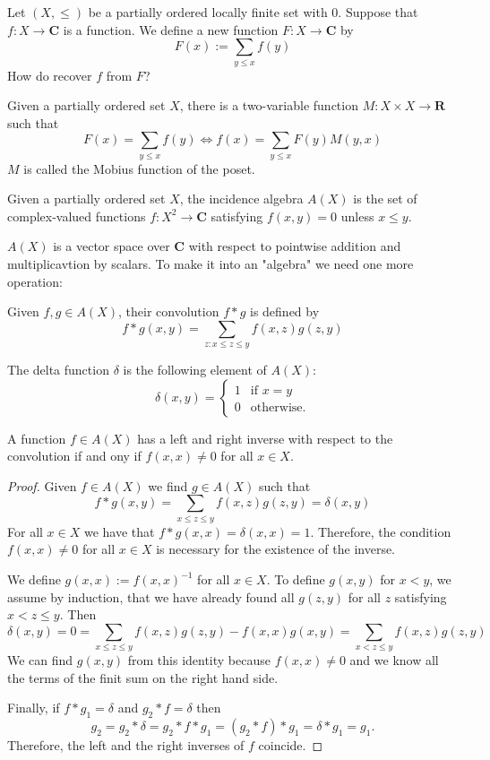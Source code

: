 Let $(X,\le )$ be a partially ordered locally finite set with 0. Suppose that $f:X\to \mathbf{C}$ is a function. We define a new function $F:X\to \mathbf{C}$ by
$$
F(x):= \sum _{y\le x}f(y)
$$
How do recover $f$ from $F$?
\begin{theorem} \label{mobposet}
Given a partially ordered set $X$, there is a two-variable function $M:X\times X\to \mathbf{R}$ such that
$$
F(x)=\sum _{y\le x}f(y)\Leftrightarrow f(x)=\sum _{y\le x}F(y)M(y,x)
$$
$M$ is called the Mobius function of the poset.
\end{theorem}
\begin{definition}
Given a partially ordered set $X$, the incidence algebra $A(X)$ is the set of complex-valued functions $f:X^{2}\to \mathbf{C}$ satisfying $f(x,y)=0$ unless $x\le y$. 
\end{definition}
$A(X)$ is a vector space over $\mathbf{C}$ with respect to pointwise addition and multiplicavtion by scalars. To make it into an "algebra" we need one more operation:
\begin{definition}
Given $f,g\in A(X)$, their convolution $f*g$ is defined by
$$
f*g(x,y)=\sum _{z:x\le z \le y} f(x,z)g(z,y)
$$
\end{definition}
\begin{definition}
The delta function $\delta$ is the following element of $A(X)$:
$$
\delta(x,y)=\begin{cases}
1 & \text{if }x=y  \\
0 & \text{otherwise}.
\end{cases}
$$
\end{definition}
\begin{lemma}
A function $f\in A(X)$ has a left and right inverse with respect to the convolution if and ony if $f(x,x)\neq0$ for all $x \in X$.
\end{lemma}
\begin{proof}
Given $f\in A(X)$ we find $g\in A(X)$ such that
$$
f*g(x,y)=\sum _{x\le z \le y}f(x,z)g(z,y)=\delta(x,y)
$$
For all $x \in X$ we have that $f*g(x,x)=\delta(x,x)=1$. Therefore, the condition $f(x,x)\neq0$ for all $x \in X$ is necessary for the existence of the inverse.

We define $g(x,x):=f(x,x)^{-1}$ for all $x \in X$. To define $g(x,y)$ for $x<y$, we assume by induction, that we have already found all $g(z,y)$ for all $z$ satisfying $x<z\le y$. Then
$$
\delta(x,y)=0=\sum _{x\le z \le y}f(x,z)g(z,y)-f(x,x)g(x,y)=\sum _{x<z \le y}f(x,z)g(z,y)
$$
We can find $g(x,y)$ from this identity because $f(x,x)\neq 0$ and we know all the terms of the finit sum on the right hand side.

Finally, if $f*g_{1}=\delta$ and $g_{2}*f=\delta$ then
$$
g_{2}=g_{2}*\delta=g_{2}*f*g_{1}=(g_{2}*f)*g_{1}=\delta*g_{1}=g_{1}.
$$
Therefore, the left and the right inverses of $f$ coincide.
\end{proof}
